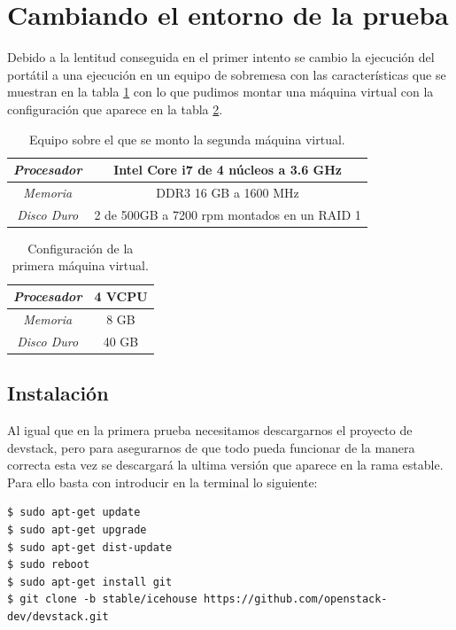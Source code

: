 \documentclass{article}
\begin{document}
\section{Cambiando el entorno de la prueba}

	Debido a la lentitud conseguida en el primer intento se cambio la ejecución del portátil a una ejecución en un equipo de sobremesa con las características que se muestran en la tabla \ref{tab:DesktopSettings} con lo que pudimos montar una máquina virtual con la configuración que aparece en la tabla \ref{tab:VirtualMachine2Settings}.

\begin{table}[h]
	\begin{center}
		\caption{Equipo sobre el que se monto la segunda máquina virtual.}
		\begin{tabular}{|c|c|}
\hline
\emph{Procesador} &
Intel Core i7 de 4 núcleos a 3.6 GHz\\ \hline
\emph{Memoria} &
DDR3 16 GB a 1600 MHz  \\ \hline
\emph{Disco Duro} &
2 de 500GB a 7200 rpm montados en un RAID 1\\ \hline
		\end{tabular}
		\label{tab:DesktopSettings}
	\end{center}
\end{table}

\begin{table}[h]
	\begin{center}
		\caption{Configuración de la primera máquina virtual.}
		\begin{tabular}{|c|c|}
\hline
\emph{Procesador} &
4 VCPU \\ \hline
\emph{Memoria} &
8 GB \\ \hline
\emph{Disco Duro} &
40 GB \\ \hline
		\end{tabular}
		\label{tab:VirtualMachine2Settings}
	\end{center}
\end{table}

\subsection{Instalación}

	Al igual que en la primera prueba necesitamos descargarnos el proyecto de devstack, pero para asegurarnos de que todo pueda funcionar de la manera correcta esta vez se descargará la ultima versión que aparece en la rama estable\cite{OpenStackVersions}. Para ello basta con introducir en la terminal lo siguiente:
\begin{lstlisting}[style=miniBash]
$ sudo apt-get update
$ sudo apt-get upgrade
$ sudo apt-get dist-update
$ sudo reboot
$ sudo apt-get install git
$ git clone -b stable/icehouse https://github.com/openstack-dev/devstack.git
\end{lstlisting}	
\end{document}
